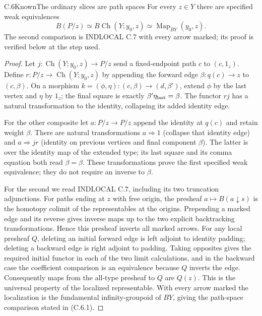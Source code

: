 \begin{claim}{C.6}{Known}{The ordinary slices are path spaces}
\label{C:slice-path}
For every $z\in Y$ there are specified weak equivalences
\[
 B(P/z)\simeq B\operatorname{Ch}(Y;y_0,z)
       \simeq\operatorname{Map}_{BY}(y_0,z).
 \tag{C.6.1}
\]
The second comparison is INDLOCAL C.7 with every arrow marked;
its proof is verified below at the step used.
\end{claim}
\begin{proof}
Let $j:\operatorname{Ch}(Y;y_0,z)\to P/z$ send a fixed-endpoint
path $c$ to $(c,1_z)$. Define
$r:P/z\to\operatorname{Ch}(Y;y_0,z)$ by appending the forward
edge $\beta:q(c)\to z$ to $(c,\beta)$.
On a morphism $k=(\phi,\eta):(c,\beta)\to(d,\beta')$, extend
$\phi$ by the last vertex and $\eta$ by $1_z$; the final square
is exactly $\beta'\eta_{\rm last}=\beta$.
The functor $rj$ has a natural transformation to the identity,
collapsing its added identity edge.

For the other composite let $a:P/z\to P/z$ append the identity
at $q(c)$ and retain weight $\beta$. There are natural
transformations $a\Rightarrow1$ (collapse that identity edge)
and $a\Rightarrow jr$ (identity on previous vertices and final
component $\beta$). The latter is over the identity map of the
extended type; its last square and its comma equation both read
$\beta=\beta$. These transformations prove the first specified
weak equivalence; they do not require an inverse to $\beta$.

For the second we read INDLOCAL C.7, including its two truncation
adjunctions. For paths ending at $z$ with free origin, the presheaf
$a\mapsto B(a\downarrow s)$ is the homotopy colimit of the
representables at the origins. Prepending a marked edge and its
reverse gives inverse maps up to the two explicit backtracking
transformations. Hence this presheaf inverts all marked arrows.
For any local presheaf $Q$, deleting an initial forward edge is
left adjoint to identity padding; deleting a backward edge is
right adjoint to padding. Taking opposites gives the required
initial functor in each of the two limit calculations, and in
the backward case the coefficient comparison is an equivalence
because $Q$ inverts the edge. Consequently maps from the all-type
presheaf to $Q$ are $Q(z)$. This is the universal property of
the localized representable. With every arrow marked the
localization is the fundamental infinity-groupoid of $BY$, giving
the path-space comparison stated in (C.6.1).
\end{proof}

